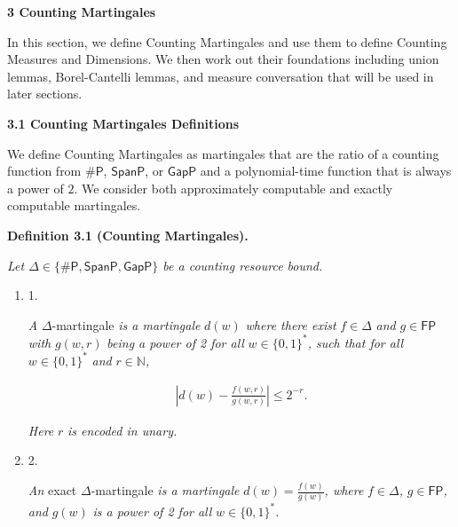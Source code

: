 \documentclass[10pt,a4paper]{article}
\begin{document}
\par\medskip\noindent\textbf{
3 Counting Martingales}\par




In this section, we define Counting Martingales and use them to define Counting Measures and Dimensions. We then work out their foundations including union lemmas, Borel-Cantelli lemmas, and measure conversation that will be used in later sections.\par




\par\medskip\noindent\textbf{
3.1 Counting Martingales Definitions}\par




We define Counting Martingales as martingales that are the ratio of a counting function from ${\mathsf{\#}\mathsf{P}}$, $\mathsf{SpanP}$, or $\mathsf{GapP}$ and a polynomial-time function that is always a power of $2$. We consider both approximately computable and exactly computable martingales.\par





\par\medskip\noindent\textbf{
\textbf{Definition 3.1}\textbf{ }(Counting Martingales)\textbf{.}
}\par



\emph{Let $\Delta\in\{{\mathsf{\#}\mathsf{P}},\mathsf{SpanP},\mathsf{GapP}\}$ be a counting resource bound.}\par


\begin{enumerate}


\item[] 
1. 


\emph{A }$\Delta$-martingale\emph{ is a martingale }$d(w)$\emph{
where there exist }$f\in\Delta$\emph{ and }$g\in\mathsf{FP}$\emph{ with }$g(w,r)$\emph{
being a power of 2 for all }$w\in\{0,1\}^{*}$\emph{, such that for all
}$w\in\{0,1\}^{*}$\emph{ and }$r\in\mathbb{N}$\emph{,}\par


\[\begin{gathered}
\left|d(w)-\frac{f(w,r)}{g(w,r)}\right|\leq 2^{-r}.
\end{gathered}\]


\emph{Here }$r$\emph{ is encoded in unary.}\par





\item[] 
2. 


\emph{An }exact $\Delta$-martingale\emph{ is a martingale }$d(w)=\frac{f(w)}{g(w)}$\emph{, where }$f\in\Delta$\emph{, }$g\in\mathsf{FP}$\emph{, and }$g(w)$\emph{
is a power of 2 for all }$w\in\{0,1\}^{*}$\emph{.}\par





\end{enumerate}
\end{document}
